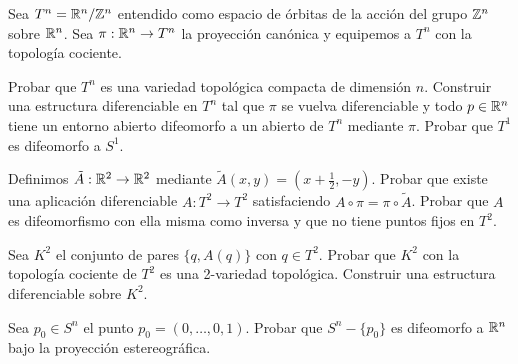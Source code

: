 \documentclass[twoside]{article}
\begin{document}
\begin{ejercicio}{8.4}
Sea $T^n=\mathbb{R}^n/\mathbb{Z}^n$ entendido como espacio de órbitas de la acción del grupo $\mathbb{Z}^n$ sobre $\mathbb{R}^n$. Sea $\pi:\mathbb{R}^n\to T^n$ la proyección canónica y equipemos a $T^n$ con la topología cociente.

Probar que $T^n$ es una variedad topológica compacta de dimensión $n$. Construir una estructura diferenciable en $T^n$ tal que $\pi$ se vuelva diferenciable y todo $p\in \mathbb{R}^n$ tiene un entorno abierto difeomorfo a un abierto de $T^n$ mediante $\pi$. Probar que $T^1$ es difeomorfo a $S^1$.  
\end{ejercicio}
\begin{solucion}

\end{solucion}

\newpage

\begin{ejercicio}{8.5}
Definimos $\tilde{A}:\mathbb{R}^2\to\mathbb{R}^2$ mediante $\tilde{A}(x,y)=(x+\frac{1}{2}, -y)$. Probar que existe una aplicación diferenciable $A:T^2\to T^2$ satisfaciendo $A\circ\pi =\pi\circ \tilde{A}$. Probar que $A$ es difeomorfismo con ella misma como inversa y que no tiene puntos fijos en $T^2$. 

Sea $K^2$ el conjunto de pares $\{q,A(q)\}$ con $q\in T^2$. Probar que $K^2$ con la topología cociente de $T^2$ es una 2-variedad topológica. Construir una estructura diferenciable sobre $K^2$.
\end{ejercicio}
\begin{solucion}

\end{solucion}

\newpage

\begin{ejercicio}{8.6}
Sea $p_0\in S^n$  el punto $p_0=(0,\dots, 0,1)$. Probar que $S^n-\{p_0\}$ es difeomorfo a $\mathbb{R}^n$ bajo la proyección estereográfica. 
\end{ejercicio}
\begin{solucion}
\end{solucion}
\end{document}

